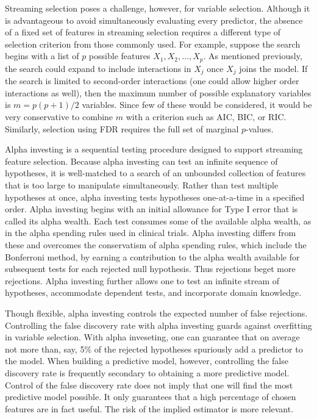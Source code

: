 \documentclass[12pt]{article}
\begin{document}
 Streaming selection poses a challenge, however, for variable selection.
  Although it is advantageous to avoid simultaneously evaluating every
 predictor, the absence of a fixed set of features in streaming selection
 requires a different type of selection criterion from those commonly used.  For
 example, suppose the search begins with a list of $p$ possible features $X_1,
 X_2, \ldots, X_p$.  As mentioned previously, the search could expand to include
 interactions in $X_j$ once $X_j$ joins the model.  If the search is limited to
 second-order interactions (one could allow higher order interactions as well),
 then the maximum number of possible explanatory variables is $m = p(p+1)/2$
 variables.  Since few of these would be considered, it would be very
 conservative to combine $m$ with a criterion such as AIC, BIC, or RIC.
  Similarly, selection using FDR requires the full set of marginal $p$-values.


 Alpha investing \citep{fosterstine08} is a sequential testing procedure
 designed to support streaming feature selection.  Because alpha investing can
 test an infinite sequence of hypotheses, it is well-matched to a search of an
 unbounded collection of features that is too large to manipulate
 simultaneously.  Rather than test multiple hypotheses at once, alpha investing
 tests hypotheses one-at-a-time in a specified order.  Alpha investing begins
 with an initial allowance for Type I error that is called its alpha wealth.
  Each test consumes some of the available alpha wealth, as in the alpha
 spending rules used in clinical trials.  Alpha investing differs from these and
 overcomes the conservatism of alpha spending rules, which include the
 Bonferroni method, by earning a contribution to the alpha wealth available for
 subsequent tests for each rejected null hypothesis.  Thus rejections beget more
 rejections.  Alpha investing further allows one to test an infinite stream of
 hypotheses, accommodate dependent tests, and incorporate domain knowledge.
 

 Though flexible, alpha investing controls the expected number of false
 rejections.  Controlling the false discovery rate with alpha investing guards
 against overfitting in variable selection.  With alpha inveseting, one can
 guarantee that on average not more than, say, 5\% of the rejected hypotheses
 spuriously add a predictor to the model.  When building a predictive model,
 however, controlling the false discovery rate is frequently secondary to
 obtaining a more predictive model.  Control of the false discovery rate does
 not imply that one will find the most predictive model possible.  It only
 guarantees that a high percentage of chosen features are in fact useful.  The
 risk of the implied estimator is more relevant.
\end{document}
